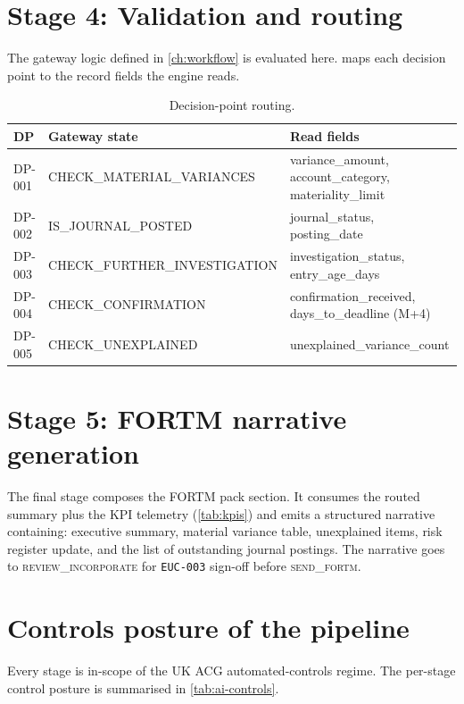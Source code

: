 \documentclass[11pt,a4paper,twoside]{report}
\newcommand{\stateid}[1]{\textsc{\lowercase{#1}}}
\begin{document}
\section{Stage 4: Validation and routing}

The gateway logic defined in \cref{ch:workflow} is evaluated here.
 maps each decision point to the record fields the
engine reads.

\begin{table}[htbp]
\caption{Decision-point routing.}\label{tab:routing}
\centering
\small
\begin{tabularx}{\linewidth}{@{}llX@{}}
\toprule
\textbf{DP} & \textbf{Gateway state} & \textbf{Read fields} \\ \midrule
DP-001 & CHECK\_MATERIAL\_VARIANCES & variance\_amount, account\_category, materiality\_limit \\
DP-002 & IS\_JOURNAL\_POSTED         & journal\_status, posting\_date \\
DP-003 & CHECK\_FURTHER\_INVESTIGATION & investigation\_status, entry\_age\_days \\
DP-004 & CHECK\_CONFIRMATION         & confirmation\_received, days\_to\_deadline (M+4) \\
DP-005 & CHECK\_UNEXPLAINED          & unexplained\_variance\_count \\
\bottomrule
\end{tabularx}
\end{table}

\section{Stage 5: FORTM narrative generation}

The final stage composes the FORTM pack section. It consumes the
routed summary plus the KPI telemetry (\cref{tab:kpis}) and emits a
structured narrative containing: executive summary, material variance
table, unexplained items, risk register update, and the list of
outstanding journal postings. The narrative goes to
\stateid{REVIEW\_INCORPORATE} for \texttt{EUC-003} sign-off before
\stateid{SEND\_FORTM}.

\section{Controls posture of the pipeline}

Every stage is in-scope of the UK ACG automated-controls regime. The
per-stage control posture is summarised in \cref{tab:ai-controls}.
\end{document}

